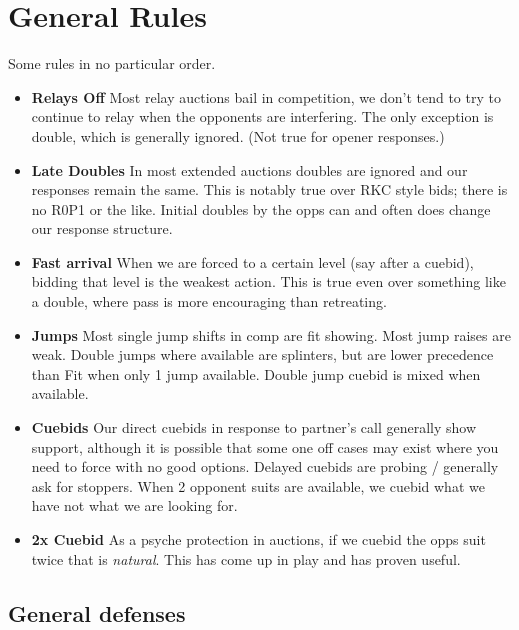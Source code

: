 \documentclass[tom-ari]{subfile}
\begin{document}
	
\chapter{General Rules}

Some rules in no particular order.

\begin{itemize}[]
\item \textbf{Relays Off} Most relay auctions bail in competition, we don't tend to try to continue to relay when the opponents are interfering. The only exception is double, which is generally ignored. (Not true for  opener responses.)
\item \textbf{Late Doubles} In most extended auctions doubles are ignored and our responses remain the same. This is notably true over RKC style bids; there is no R0P1 or the like. Initial doubles by the opps can and often does change our response structure.
\item \textbf{Fast arrival} When we are forced to a certain level (say after a cuebid), bidding that level is the weakest action. This is true even over something like a double, where pass is more encouraging than retreating.
\item \textbf{Jumps} Most single jump shifts in comp are fit showing. Most jump raises are weak. Double jumps where available are splinters, but are lower precedence than Fit when only 1 jump available. Double jump cuebid is mixed when available.
\item \textbf{Cuebids} Our direct cuebids in response to partner's call generally show support, although it is possible that some one off cases may exist where you need to force with no good options.  Delayed cuebids are probing / generally ask for stoppers. When 2 opponent suits are available, we cuebid what we have not what we are looking for.
\item \textbf{2x Cuebid} As a psyche protection in  auctions, if we cuebid the opps suit twice that is \textit{natural}. This has come up in play and has proven useful.
\end{itemize}

\section{General defenses}
\end{document}

